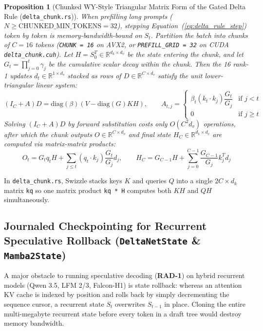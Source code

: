 \documentclass[10pt,a4paper]{article}
\theoremstyle{swzstyle}
\newtheorem{proposition}[theorem]{Proposition}
\newcommand{\code}[1]{\texttt{#1}}
\begin{document}
\begin{proposition}[Chunked WY-Style Triangular Matrix Form of the Gated Delta Rule (\texttt{delta\_chunk.rs})]
When prefilling long prompts ($N \ge \text{CHUNKED\_MIN\_TOKENS} = 32$), stepping Equation~(\ref{eq:delta_rule_step}) token by token is memory-bandwidth-bound on $S_t$. Partition the batch into chunks of $C = 16$ tokens (\code{CHUNK = 16} on AVX2, or \code{PREFILL\_GRID = 32} on CUDA \code{delta\_chunk.cuh}). Let $H = S_0^T \in \mathbb{R}^{d_k \times d_v}$ be the state entering the chunk, and let $G_t = \prod_{j=0}^{t} \gamma_j$ be the cumulative scalar decay within the chunk. Then the 16 rank-1 updates $d_t \in \mathbb{R}^{1 \times d_v}$ stacked as rows of $D \in \mathbb{R}^{C \times d_v}$ satisfy the unit lower-triangular linear system:
\begin{equation}
  (I_C + A) D = \text{diag}(\beta) \left(V - \text{diag}(G) K H\right), \qquad A_{t,j} = \begin{cases} \beta_t (k_t \cdot k_j) \dfrac{G_t}{G_j} & \text{if } j < t \\ 0 & \text{if } j \ge t \end{cases}
  \label{eq:chunked_delta_system}
\end{equation}
Solving $(I_C + A) D$ by forward substitution costs only $O(C^2 d_v)$ operations, after which the chunk outputs $O \in \mathbb{R}^{C \times d_v}$ and final state $H_C \in \mathbb{R}^{d_k \times d_v}$ are computed via matrix-matrix products:
\begin{equation}
  O_t = G_t q_t H + \sum_{j \le t} (q_t \cdot k_j) \frac{G_t}{G_j} d_j, \qquad H_C = G_{C-1} H + \sum_{j=0}^{C-1} \frac{G_{C-1}}{G_j} k_j^T d_j
\end{equation}
\end{proposition}
In \code{delta\_chunk.rs}, Swizzle stacks keys $K$ and queries $Q$ into a single $2C \times d_k$ matrix \code{kq} so one matrix product \code{kq * H} computes both $K H$ and $Q H$ simultaneously.

\subsection{Journaled Checkpointing for Recurrent Speculative Rollback (\texttt{DeltaNetState} \& \texttt{Mamba2State})}

A major obstacle to running speculative decoding (\textbf{RAD-1}) on hybrid recurrent models (Qwen 3.5, LFM 2/3, Falcon-H1) is state rollback: whereas an attention KV cache is indexed by position and rolls back by simply decrementing the sequence cursor, a recurrent state $S_t$ overwrites $S_{t-1}$ in place. Cloning the entire multi-megabyte recurrent state before every token in a draft tree would destroy memory bandwidth.
\end{document}
